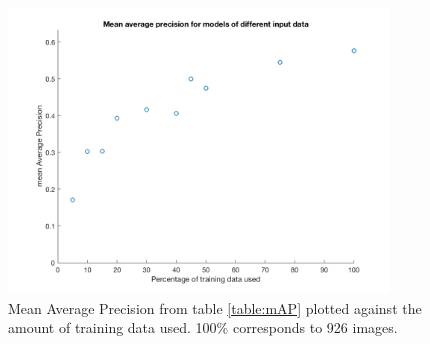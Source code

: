 \begin{figure}[h]
\begin{center}
\includegraphics[width = 0.9\textwidth]{./Images/mapPlot.png}
\caption{Mean Average Precision from table \ref{table:mAP} plotted against the amount of training data used. 100\% corresponds to 926 images.}
\label{fig:mAPResult}
\end{center}
\end{figure}

